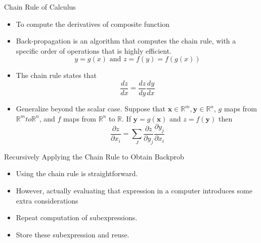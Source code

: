 \documentclass[10pt]{beamer}
\begin{document}

	\begin{frame}{Chain Rule of Calculus}
		\begin{itemize}
			\pause
			\item To compute the derivatives of composite function
			\pause
			\item Back-propagation is an algorithm that computes the chain rule, with a specific order of operations that is highly efficient.
			$$y=g(x) \text{~and~} z=f(y)=f(g(x))$$
			
			\pause
			\item The chain rule states that
			$$\frac{dz}{dx}=\frac{dz}{dy}\frac{dy}{dx}$$
			
			\pause
			\item Generalize beyond the scalar case. Suppose that $\bm{x}\in\mathbb{R}^m,\bm{y}\in\mathbb{R}^n$, $g$ maps from $\mathbb{R}^m to \mathbb{R}^n$, and $f$ maps from $\mathbb{R}^n$ to $\mathbb{R}$. If $\bm{y}=g(\bm{x})$ and $z=f(\bm{y})$ then
			$$\frac{\partial z}{\partial x_i}=\sum_J\frac{\partial z}{\partial y_j}\frac{\partial y_j}{\partial x_i}$$
		\end{itemize}
	\end{frame}

	\begin{frame}{Recursively Applying the Chain Rule to Obtain Backprob}
		\begin{itemize}
			\item Using the chain rule is straightforward.
			\pause
			\item However, actually evaluating that expression in a computer introduces some extra considerations
			\pause
			\item Repeat computation of subexpressions.
			\pause
			\item Store these subexpression and reuse.
		\end{itemize}
	\end{frame}
\end{document}
